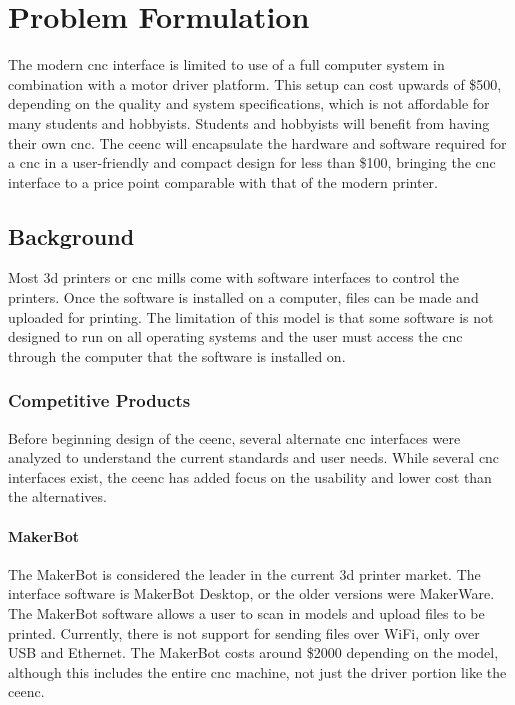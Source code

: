 \chapter{Problem Formulation}

The modern \gls{cnc} interface is limited to use of a full computer system in combination with a motor driver platform.
This setup can cost upwards of \$500, depending on the quality and system specifications, which is not affordable for many students and hobbyists.
Students and hobbyists will benefit from having their own \gls{cnc}.
The \gls{ceenc} will encapsulate the hardware and software required for a \gls{cnc} in a user-friendly and compact design for less than \$100, bringing the \gls{cnc} interface to a price point comparable with that of the modern printer.

\section{Background}
Most \gls{3d} printers or \gls{cnc} mills come with software interfaces to control the printers.
Once the software is installed on a computer, files can be made and uploaded for printing.
The limitation of this model is that some software is not designed to run on all operating systems and the user must access the \gls{cnc} through the computer that the software is installed on.

\subsection{Competitive Products}
Before beginning design of the \gls{ceenc}, several alternate \gls{cnc} interfaces were analyzed to understand the current standards and user needs.
While several \gls{cnc} interfaces exist, the \gls{ceenc} has added focus on the usability and lower cost than the alternatives.

\subsubsection{MakerBot}
The MakerBot is considered the leader in the current \gls{3d} printer market.
The interface software is MakerBot Desktop, or the older versions were MakerWare.
The MakerBot software allows a user to scan in models and upload files to be printed.
Currently, there is not support for sending files over WiFi, only over USB and Ethernet.
The MakerBot costs around \$2000 depending on the model, although this includes the entire \gls{cnc} machine, not just the driver portion like the \gls{ceenc}.

